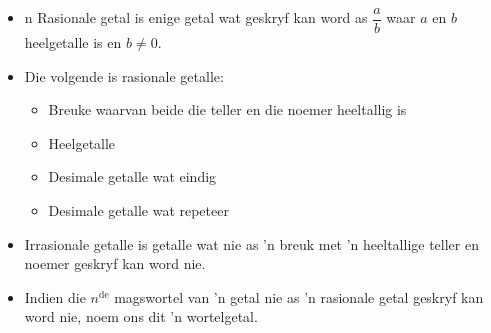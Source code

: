 

\begin{itemize}[itemsep=5pt, label=\textbullet{}]

\item n Rasionale getal is enige getal wat geskryf kan word as $\dfrac{a}{b}$
waar $a$ en $b$ heelgetalle is en $b\ne 0$.
\item Die volgende is rasionale getalle:
    \begin{itemize}[noitemsep]
	\item Breuke waarvan beide die teller en die noemer heeltallig is
	\item Heelgetalle
	\item Desimale getalle wat eindig
	\item Desimale getalle wat repeteer
    \end{itemize}
\item Irrasionale getalle is getalle wat nie as ’n breuk met ’n heeltallige teller en noemer geskryf kan word nie.
\item Indien die ${n}^{\mathrm{de}}$ magswortel van ’n getal nie as ’n rasionale getal geskryf kan word nie, noem ons dit ’n wortelgetal.

\end{itemize}
